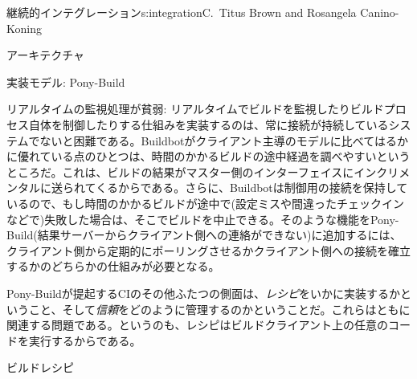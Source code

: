 \begin{aosachapter}{継続的インテグレーション}{s:integration}{C.\ Titus Brown and Rosangela Canino-Koning}
\begin{aosasect1}{アーキテクチャ}
\begin{aosasect2}{実装モデル: Pony-Build}
\begin{aosadescription}
  \item{リアルタイムの監視処理が貧弱:} リアルタイムでビルドを監視したりビルドプロセス自体を制御したりする仕組みを実装するのは、常に接続が持続しているシステムでないと困難である。Buildbotがクライアント主導のモデルに比べてはるかに優れている点のひとつは、時間のかかるビルドの途中経過を調べやすいというところだ。これは、ビルドの結果がマスター側のインターフェイスにインクリメンタルに送られてくるからである。さらに、Buildbotは制御用の接続を保持しているので、もし時間のかかるビルドが途中で(設定ミスや間違ったチェックインなどで)失敗した場合は、そこでビルドを中止できる。そのような機能をPony-Build(結果サーバーからクライアント側への連絡ができない)に追加するには、クライアント側から定期的にポーリングさせるかクライアント側への接続を確立するかのどちらかの仕組みが必要となる。

\end{aosadescription}

Pony-Buildが提起するCIのその他ふたつの側面は、\emph{レシピ}をいかに実装するかということ、そして\emph{信頼}をどのように管理するのかということだ。これらはともに関連する問題である。というのも、レシピはビルドクライアント上の任意のコードを実行するからである。

\end{aosasect2}

\begin{aosasect2}{ビルドレシピ}


\end{aosasect2}
\end{aosasect1}
\end{aosachapter}
